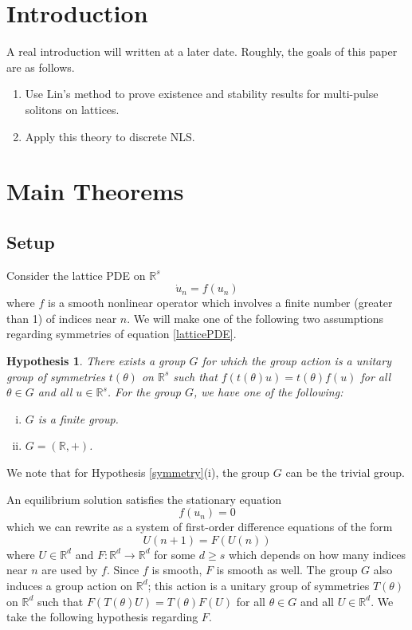 \documentclass[12pt]{article}
\def\R{{\mathbb R}}
\newtheorem{hypothesis}{Hypothesis}
\begin{document}
\section{Introduction}

A real introduction will written at a later date. Roughly, the goals of this paper are as follows.
\begin{enumerate}
	\item Use Lin's method to prove existence and stability results for multi-pulse solitons on lattices. 
	\item Apply this theory to discrete NLS.
\end{enumerate}

\section{Main Theorems}

\subsection{Setup}

Consider the lattice PDE on $\R^s$
\begin{equation}\label{latticePDE}
\dot{u}_n = f(u_n)
\end{equation}
where $f$ is a smooth nonlinear operator which involves a finite number (greater than 1) of indices near $n$. We will make one of the following two assumptions regarding symmetries of equation \eqref{latticePDE}.

\begin{hypothesis}\label{symmetryhyp}
There exists a group $G$ for which the group action is a unitary group of symmetries $t(\theta)$ on $\R^s$ such that $f(t(\theta)u) = t(\theta)f(u)$ for all $\theta \in G$ and all $u \in \R^s$. For the group $G$, we have one of the following:
\begin{enumerate}[(i)]
\item $G$ is a finite group.
\item $G = (\R, +)$.
\end{enumerate}
\end{hypothesis}
We note that for Hypothesis \ref{symmetry}(i), the group $G$ can be the trivial group.

An equilibrium solution satisfies the stationary equation 
\begin{equation}\label{stationaryeq}
f(u_n) = 0
\end{equation}
which we can rewrite as a system of first-order difference equations of the form
\begin{equation}\label{diffeq}
U(n+1) = F(U(n))
\end{equation}
where $U \in \R^d$ and $F:\R^d \rightarrow \R^d$ for some $d \geq s$ which depends on how many indices near $n$ are used by $f$. Since $f$ is smooth, $F$ is smooth as well. The group $G$ also induces a group action on $\R^d$; this action is a unitary group of symmetries $T(\theta)$ on $\R^d$ such that $F(T(\theta)U) = T(\theta)F(U)$ for all $\theta \in G$ and all $U \in \R^d$. We take the following hypothesis regarding $F$.
\end{document}
